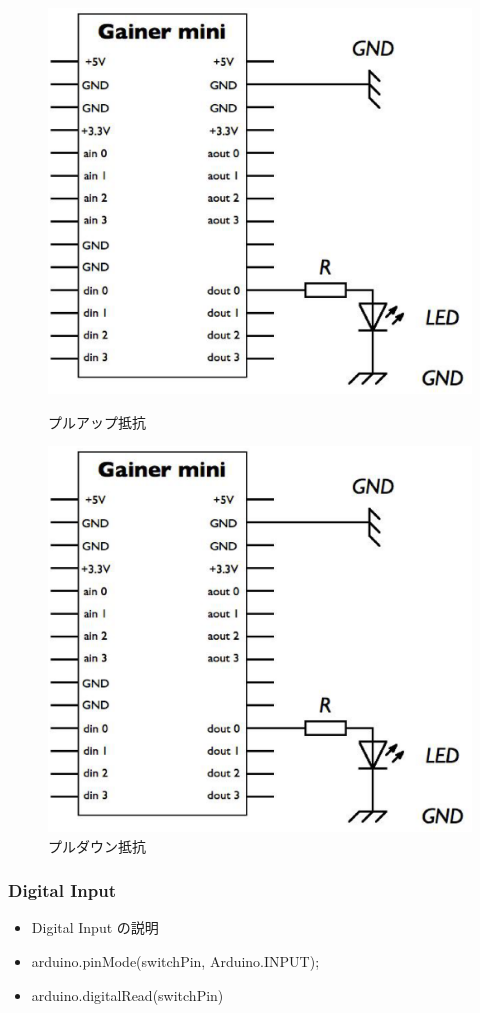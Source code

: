 \documentclass[11pt,a4paper]{jarticle}
\begin{document}
\begin{figure}[h]
 \begin{minipage}{0.5\columnwidth}
  \centering
  \includegraphics[width=0.8\columnwidth]{img/circuit.eps}
  \caption{プルアップ抵抗}
 \end{minipage}
 \begin{minipage}{0.5\columnwidth}
  \centering
  \includegraphics[width=0.8\columnwidth]{img/circuit.eps}
  \caption{プルダウン抵抗}
 \end{minipage}
\end{figure}

\subsubsection*{Digital Input}
\begin{itemize}
 \item Digital Input の説明
 \item arduino.pinMode(switchPin, Arduino.INPUT);  
 \item arduino.digitalRead(switchPin)
\end{itemize}
\end{document}
